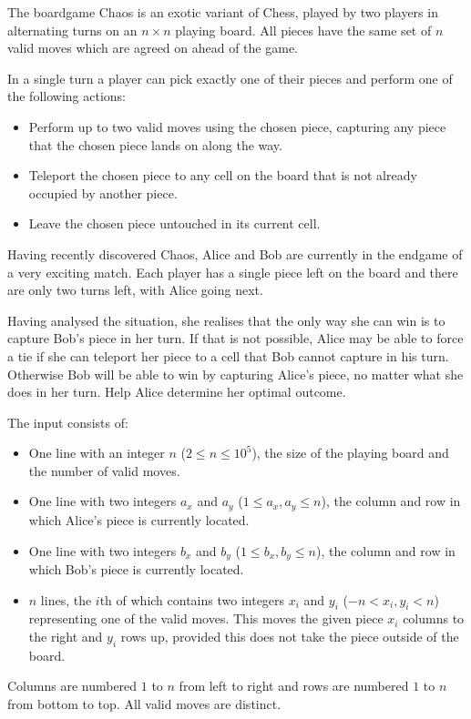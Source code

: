 
%
The boardgame Chaos is an exotic variant of Chess, played by two players in
alternating turns on an $n\times n$ playing board. All pieces have the same set
of $n$ valid moves which are agreed on ahead of the game.

In a single turn a player can pick exactly one of their pieces
and perform one of the following actions:
\begin{itemize}
    \item Perform up to two valid moves using the chosen piece, capturing any
        piece that the chosen piece lands on along the way.
    \item Teleport the chosen piece to any cell on the board that is not
        already occupied by another piece.
    \item Leave the chosen piece untouched in its current cell.
\end{itemize}

Having recently discovered Chaos, Alice and Bob are currently in the endgame of
a very exciting match. Each player has a single piece left on the board and
there are only two turns left, with Alice going next.

Having analysed the situation, she realises that the only way she can win is to
capture Bob's piece in her turn. If that is not possible, Alice may be able to
force a tie if she can teleport her piece to a cell that Bob cannot capture in
his turn. Otherwise Bob will be able to win by capturing Alice's piece, no
matter what she does in her turn. Help Alice determine her optimal outcome.

\begin{Input}
The input consists of:
\begin{itemize}
    \item One line with an integer $n$ ($2 \leq n \leq 10^5$), the size of the
        playing board and the number of valid moves.
    \item One line with two integers $a_x$ and $a_y$ ($1 \leq a_x, a_y \leq n$),
        the column and row in which Alice's piece is currently located.
    \item One line with two integers $b_x$ and $b_y$ ($1 \leq b_x, b_y \leq n$),
        the column and row in which Bob's piece is currently located.
    \item $n$ lines, the $i$th of which contains two integers $x_i$ and $y_i$
        ($-n < x_i, y_i < n$) representing one of the valid moves. This
        moves the given piece $x_i$ columns to the right and $y_i$ rows
	up, provided this does not take the piece outside of the board.
\end{itemize}

Columns are numbered $1$ to $n$ from left to right and rows are numbered $1$ to
$n$ from bottom to top. All valid moves are distinct.
\end{Input}

